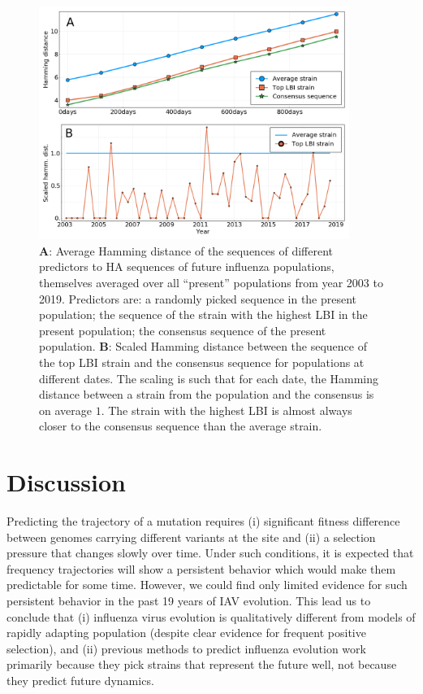 \documentclass[reprint,amsmath,amssymb,superscriptaddress,showpacs,rmp]{revtex4-1}
\begin{document}
\begin{figure}
	\centering
	\includegraphics[width=0.9\textwidth]{./Figures/Panel4.png}
	\caption{\textbf{A}: Average Hamming distance of the sequences of different predictors to HA sequences of future influenza populations, themselves averaged over all ``present'' populations from year 2003 to 2019. Predictors are: a randomly picked sequence in the present population; the sequence of the strain with the highest LBI in the present population; the consensus sequence of the present population. \textbf{B}: Scaled Hamming distance between the sequence of the top LBI strain and the consensus sequence for populations at different dates. The scaling is such that for each date, the Hamming distance between a strain from the population and the consensus is on average $1$. The strain with the highest LBI is almost always closer to the consensus sequence than the average strain.}
	\label{fig:LBI_consensus}
\end{figure}


\section*{Discussion} %
\label{sec:discussion}

Predicting the trajectory of a mutation requires (i) significant fitness difference between genomes carrying different variants at the site and (ii) a selection pressure that changes slowly over time. 
Under such conditions, it is expected that frequency trajectories will show a persistent behavior which would make them predictable for some time. 
However, we could find only limited evidence for such persistent behavior in the past 19 years of IAV evolution. 
This lead us to conclude that (i) influenza virus evolution is qualitatively different from models of rapidly adapting population (despite clear evidence for frequent positive selection), and (ii) previous methods to predict influenza evolution work primarily because they pick strains that represent the future well, not because they predict future dynamics. 
\end{document}
